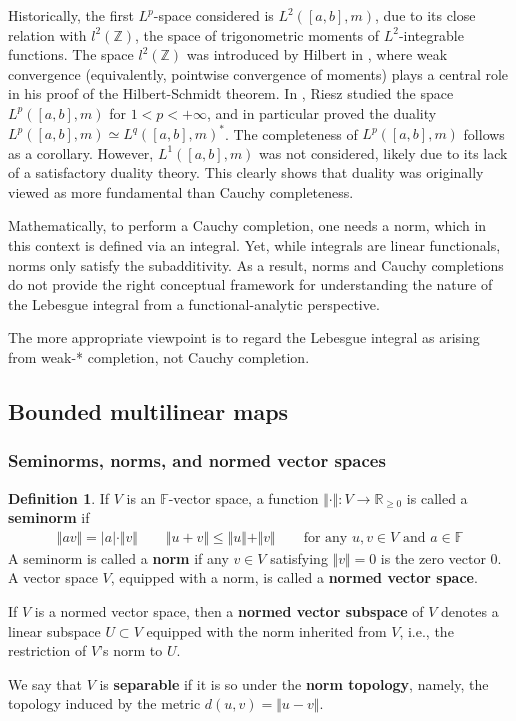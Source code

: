 \documentclass[12pt,b5paper,notitlepage]{article}
\theoremstyle{definition}
\newtheorem{df}{Definition}[subsection]
\theoremstyle{plain}
\newcommand{\Zbb}{\mathbb Z}
\newcommand{\Rbb}{\mathbb R}
\newcommand{\Fbb}{\mathbb F}
\newcommand{\hqed}{\hfill\qedsymbol}
\numberwithin{equation}{section}
\begin{document}
Historically, the first $L^p$-space considered is $L^2([a,b],m)$, due to its close relation with $l^2(\Zbb)$, the space of trigonometric moments of $L^2$-integrable functions. The space $l^2(\Zbb)$ was introduced by Hilbert in \cite{Hil06}, where weak convergence (equivalently, pointwise convergence of moments) plays a central role in his proof of the Hilbert-Schmidt theorem. In \cite{Rie10}, Riesz studied the space $L^p([a,b],m)$ for $1<p<+\infty$, and in particular proved the duality $L^p([a,b],m)\simeq L^q([a,b],m)^*$. The completeness of $L^p([a,b],m)$ follows as a corollary. However, $L^1([a,b],m)$ was not considered, likely due to its lack of a satisfactory duality theory. This clearly shows that duality was originally viewed as more fundamental than Cauchy completeness.


Mathematically, to perform a Cauchy completion, one needs a norm, which in this context is defined via an integral. Yet, while integrals are linear functionals, norms only satisfy the subadditivity. As a result, norms and Cauchy completions do not provide the right conceptual framework for understanding the nature of the Lebesgue integral from a functional-analytic perspective.


The more appropriate viewpoint is to regard the Lebesgue integral as arising from weak-* completion, not Cauchy completion.

\normalsize


\subsection{Bounded multilinear maps}


\subsubsection{Seminorms, norms, and normed vector spaces}

\begin{df}\label{lb45}
If $V$ is an $\Fbb$-vector space, a function $\Vert\cdot\Vert:V\rightarrow\Rbb_{\geq0}$ is called a \textbf{seminorm}  if
\begin{align}\label{eq28}
\Vert av\Vert=|a|\cdot\Vert v\Vert\qquad \Vert u+v\Vert\leq\Vert u\Vert+\Vert v\Vert\qquad\text{for any $u,v\in V$ and $a\in\Fbb$}
\end{align}
A seminorm is called a \textbf{norm} if any $v\in V$ satisfying $\Vert v\Vert=0$ is the zero vector $0$. A vector space $V$, equipped with a norm, is called a \textbf{normed vector space}.

If $V$ is a normed vector space, then a \textbf{normed vector subspace}  of $V$ denotes a linear subspace $U\subset V$ equipped with the norm inherited from $V$, i.e., the restriction of $V$'s norm to $U$.  

We say that $V$ is \textbf{separable}  if it is so under the \textbf{norm topology},  namely, the topology induced by the metric $d(u,v)=\Vert u-v\Vert$. \hqed
\end{df}
\end{document}
